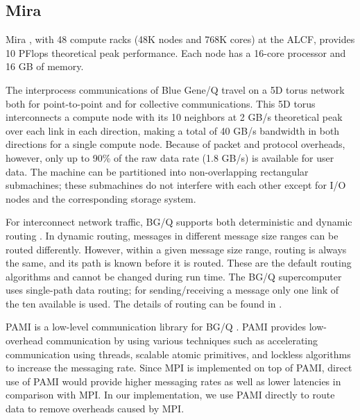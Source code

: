 \subsection{Mira}
\label{sec:system}

Mira \cite{Chen:BGQ}, with 48 compute racks (48K nodes and 768K cores) at the ALCF, provides 10 PFlops theoretical peak performance. Each node has a 16-core processor and 16 GB of memory.

The interprocess communications of Blue Gene/Q travel on a 5D torus network both for point-to-point and for collective communications. This 5D torus interconnects a compute node with its 10 neighbors at 2 GB/s theoretical peak over each link in each direction, making a total of 40 GB/s bandwidth in both directions for a single compute node. Because of packet and protocol overheads, however, only up to 90\% of the raw data rate (1.8 GB/s) is available for user data. The machine can be partitioned into non-overlapping rectangular submachines; these submachines do not interfere with each other except for I/O nodes and the corresponding storage system.

For interconnect network traffic, BG/Q supports both deterministic and dynamic routing \cite{Chen:BGQ}. In dynamic routing, messages in different message size ranges can be routed differently. However, within a given message size range, routing is always the same, and its path is known before it is routed. These are the default routing algorithms and cannot be changed during run time. The BG/Q supercomputer uses single-path data routing; for sending/receiving a message only one link of the ten available is used. The details of routing can be found in \cite{Chen:BGQ}.

PAMI is a low-level communication library for BG/Q \cite{PAMI:Kumar}. PAMI provides low-overhead communication by using various techniques such as accelerating communication using threads, scalable atomic primitives, and lockless algorithms to increase the messaging rate. Since MPI is implemented on top of PAMI, direct use of PAMI would provide higher messaging rates as well as lower latencies in comparison with MPI. In our implementation, we use PAMI directly to route data to remove overheads caused by MPI.
